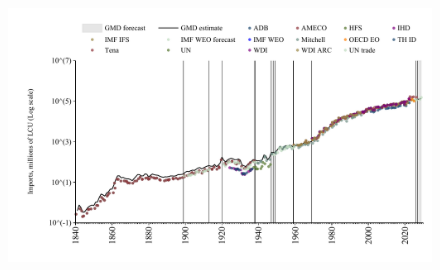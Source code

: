 \documentclass[12pt,a4paper,landscape]{article}
\begin{document}
\begin{adjustbox}{max totalsize={\paperwidth}{\paperheight},center}
\begin{minipage}[t][\textheight][t]{\textwidth}
\begin{figure}[H]
\centering
\includegraphics[width=\textwidth,height=0.6\textheight,keepaspectratio]{graphs/NZL_imports.pdf}
\end{figure}
\end{minipage}
\end{adjustbox}
\end{document}
